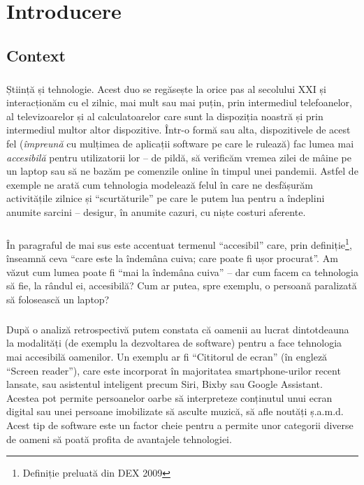 \chapter*{Introducere} 

\section*{Context}
\paragraph{}
Știință și tehnologie.
Acest duo se regăsește la orice pas al secolului XXI și interacționăm cu el zilnic, mai mult sau mai puțin, prin intermediul telefoanelor, al televizoarelor și al calculatoarelor care sunt la dispoziția noastră și prin intermediul multor altor dispozitive.
Într-o formă sau alta, dispozitivele de acest fel (\emph{împreună} cu mulțimea de aplicații software pe care le rulează) fac lumea mai \emph{accesibilă} pentru utilizatorii lor – de pildă, să verificăm vremea zilei de mâine pe un laptop sau să ne bazăm pe comenzile online în timpul unei pandemii.
Astfel de exemple ne arată cum tehnologia modelează felul în care ne desfășurăm activitățile zilnice și ``scurtăturile'' pe care le putem lua pentru a îndeplini anumite sarcini – desigur, în anumite cazuri, cu niște costuri aferente.

\paragraph{}
În paragraful de mai sus este accentuat termenul ``accesibil'' care, prin definiție\footnote{Definiție preluată din DEX 2009}, înseamnă ceva ``care este la îndemâna cuiva; care poate fi ușor procurat''.
Am văzut cum lumea poate fi ``mai la îndemâna cuiva'' – dar cum facem ca tehnologia să fie, la rândul ei, accesibilă?
Cum ar putea, spre exemplu, o persoană paralizată să folosească un laptop?

\paragraph{}
După o analiză retrospectivă putem constata că oamenii au lucrat dintotdeauna la modalități (de exemplu la dezvoltarea de software) pentru a face tehnologia mai accesibilă oamenilor.
Un exemplu ar fi ``Cititorul de ecran'' (în engleză ``Screen reader''), care este incorporat în majoritatea smartphone-urilor recent lansate, sau asistentul inteligent precum Siri, Bixby sau Google Assistant.
Acestea pot permite persoanelor oarbe să interpreteze conținutul unui ecran digital sau unei persoane imobilizate să asculte muzică, să afle noutăți ș.a.m.d.
Acest tip de software este un factor cheie pentru a permite unor categorii diverse de oameni să poată profita de avantajele tehnologiei.

